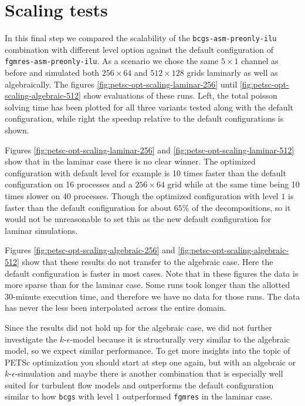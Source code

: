 \section{Scaling tests}

In this final step we compared the scalability of the
\texttt{bcgs-asm-preonly-ilu} combination with different level option against
the default configuration of \texttt{fgmres-asm-preonly-ilu}. As a scenario we
chose the same $5 \times 1$ channel as before and simulated both $256 \times 64$
and $512 \times 128$ grids laminarly as well as algebraically. The figures
\ref{fig:petsc-opt-scaling-laminar-256} until
\ref{fig:petsc-opt-scaling-algebraic-512} show evaluations of these runs. Left,
the total poisson solving time has been plotted for all three variants tested
along with the default configuration, while right the speedup relative to the
default configurations is shown.

Figures \ref{fig:petsc-opt-scaling-laminar-256} and
\ref{fig:petsc-opt-scaling-laminar-512} show that in the laminar case there is
no clear winner. The optimized configuration with default level for example is
10 times faster than the default configuration on 16 processes and a
$256 \times 64$ grid while at the same time being 10 times slower on 40
processes. Though the optimized configuration with level $1$ is faster than the
default configuration for about $65\%$ of the decompositions, so it would not be
unreasonable to set this as the new default configuration for laminar
simulations.

Figures \ref{fig:petsc-opt-scaling-algebraic-256} and
\ref{fig:petsc-opt-scaling-algebraic-512} show that these results do not
transfer to the algebraic case. Here the default configuration is faster in most
cases. Note that in these figures the data is more sparse than for the laminar
case. Some runs took longer than the allotted 30-minute execution time, and
therefore we have no data for those runs. The data has never the less been
interpolated across the entire domain.

Since the results did not hold up for the algebraic case, we did not further
investigate the $k$-$\epsilon$-model because it is structurally very similar to
the algebraic model, so we expect similar performance. To get more insights into
the topic of PETSc optimization you should start at step one again, but with an
algebraic or $k$-$\epsilon$-simulation and maybe there is another combination
that is especially well suited for turbulent flow models and outperforms the
default configuration similar to how \texttt{bcgs} with level $1$ outperformed
\texttt{fgmres} in the laminar case.


